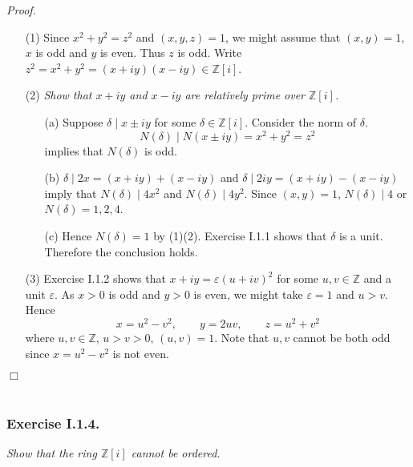 \documentclass{article}
\begin{document}
\emph{Proof.}
\begin{enumerate}
\item[(1)]
  Since $x^2+y^2=z^2$ and $(x,y,z) = 1$,
  we might assume that $(x,y) = 1$, $x$ is odd and $y$ is even.
  Thus $z$ is odd.
  Write $z^2 = x^2+y^2 = (x+iy)(x-iy) \in \mathbb{Z}[i]$.

\item[(2)]
  \emph{Show that $x+iy$ and $x-iy$ are relatively prime over $\mathbb{Z}[i]$.}
  \begin{enumerate}
  \item[(a)]
    Suppose $\delta \mid x \pm iy$ for some $\delta \in \mathbb{Z}[i]$.
    Consider the norm of $\delta$.
    \[
      N(\delta) \mid N(x \pm iy) = x^2 + y^2 = z^2
    \]
    implies that $N(\delta)$ is odd.
  
  \item[(b)]
    $\delta \mid 2x = (x+iy)+(x-iy)$ and $\delta \mid 2iy = (x+iy)-(x-iy)$
    imply that $N(\delta) \mid 4x^2$ and $N(\delta) \mid 4y^2$.
    Since $(x,y) = 1$, $N(\delta) \mid 4$ or $N(\delta) = 1, 2, 4$.

  \item[(c)]
    Hence $N(\delta) = 1$ by (1)(2).
    Exercise I.1.1 shows that $\delta$ is a unit.
    Therefore the conclusion holds.
  \end{enumerate}

\item[(3)]
  Exercise I.1.2 shows that $x+iy = \varepsilon (u+iv)^2$
  for some $u, v \in \mathbb{Z}$ and a unit $\varepsilon$.
  As $x > 0$ is odd and $y > 0$ is even, we might take $\varepsilon = 1$ and $u > v$.
  Hence
  \[
    x = u^2-v^2,
    \qquad
    y = 2uv,
    \qquad
    z = u^2+v^2
  \]
  where $u, v \in \mathbb{Z}$, $u > v > 0$, $(u,v) = 1$.
  Note that $u, v$ cannot be both odd since $x = u^2-v^2$ is not even.
\end{enumerate}
$\Box$ \\\\






\subsubsection*{Exercise I.1.4.}
\emph{Show that the ring $\mathbb{Z}[i]$ cannot be ordered.} \\
\end{document}
